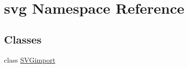 \hypertarget{namespacesvg}{}\section{svg Namespace Reference}
\label{namespacesvg}
\subsection*{Classes}
\begin{DoxyCompactItemize}
\item 
class \hyperlink{classsvg_1_1_s_v_gimport}{S\+V\+Gimport}
\end{DoxyCompactItemize}
